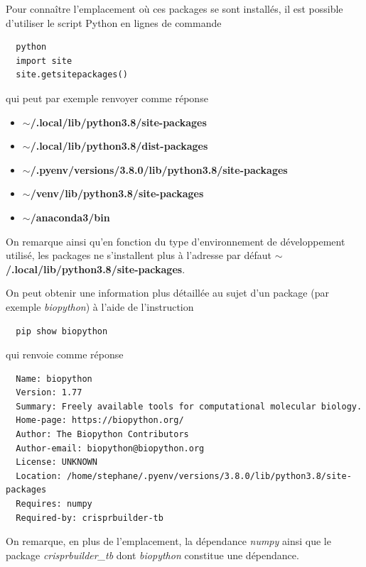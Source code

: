 \documentclass[twoside,a4paper,11pt,frenchb,openany]{report}
\begin{document}
Pour connaître l'emplacement où ces packages se sont installés, il est possible d'utiliser le script Python en lignes de commande

\begin{verbatim}
  python
  import site
  site.getsitepackages()
\end{verbatim}

qui peut par exemple renvoyer comme réponse

\begin{itemize}
\item \textbf{$\sim$/.local/lib/python3.8/site-packages} 
\item \textbf{$\sim$/.local/lib/python3.8/dist-packages}
\item \textbf{$\sim$/.pyenv/versions/3.8.0/lib/python3.8/site-packages}
\item \textbf{$\sim$/venv/lib/python3.8/site-packages} 
\item \textbf{$\sim$/anaconda3/bin}
\end{itemize}

On remarque ainsi qu'en fonction du type d'environnement de développement utilisé, les packages ne s'installent plus à l'adresse par défaut \textbf{$\sim$/.local/lib/python3.8/site-packages}.

On peut obtenir une information plus détaillée au sujet d'un package (par exemple \textit{biopython}) à l'aide de l'instruction

\begin{verbatim}
  pip show biopython
\end{verbatim}

qui renvoie comme réponse 

\begin{verbatim}
  Name: biopython
  Version: 1.77
  Summary: Freely available tools for computational molecular biology.
  Home-page: https://biopython.org/
  Author: The Biopython Contributors
  Author-email: biopython@biopython.org
  License: UNKNOWN
  Location: /home/stephane/.pyenv/versions/3.8.0/lib/python3.8/site-packages
  Requires: numpy
  Required-by: crisprbuilder-tb
\end{verbatim}

On remarque, en plus de l'emplacement, la dépendance \textit{numpy} ainsi que le package \textit{crisprbuilder\_tb} dont \textit{biopython} constitue une dépendance.
\end{document}
